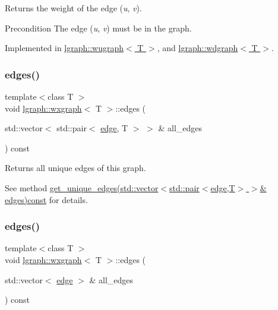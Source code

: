 Returns the weight of the edge ({\itshape u}, {\itshape v}). 

\begin{DoxyPrecond}{Precondition}
The edge ({\itshape u}, {\itshape v}) must be in the graph. 
\end{DoxyPrecond}


Implemented in \hyperlink{classlgraph_1_1wugraph_a38ed0dfad1c531dd3e6fc217cc061c2d}{lgraph\+::wugraph$<$ T $>$}, and \hyperlink{classlgraph_1_1wdgraph_a319aea927db9734903b4cf7d147ad687}{lgraph\+::wdgraph$<$ T $>$}.

\mbox{\label{classlgraph_1_1wxgraph_a1b89f56544185e33d54e72a8ed19a789}} 
\subsubsection{\texorpdfstring{edges()}{edges()}\hspace{0.1cm}{\footnotesize\ttfamily [1/2]}}
{\footnotesize\ttfamily template$<$class T $>$ \\
void \hyperlink{classlgraph_1_1wxgraph}{lgraph\+::wxgraph}$<$ T $>$\+::edges (\begin{DoxyParamCaption}\item[{std\+::vector$<$ std\+::pair$<$ \hyperlink{namespacelgraph_a76bd7d50719f03de7a85db259d80d572}{edge}, T $>$ $>$ \&}]{all\+\_\+edges }\end{DoxyParamCaption}) const}



Returns all unique edges of this graph. 

See method \hyperlink{classlgraph_1_1wxgraph_a50a9be174538c50c0f2a7ebeaa34ca4d}{get\+\_\+unique\+\_\+edges(std\+::vector$<$std\+::pair$<$edge,\+T$>$ $>$\& edges)const} for details. \mbox{\label{classlgraph_1_1wxgraph_ae99b335ca0cc70f619ae7c186d2dc7ac}} 
\subsubsection{\texorpdfstring{edges()}{edges()}\hspace{0.1cm}{\footnotesize\ttfamily [2/2]}}
{\footnotesize\ttfamily template$<$class T $>$ \\
void \hyperlink{classlgraph_1_1wxgraph}{lgraph\+::wxgraph}$<$ T $>$\+::edges (\begin{DoxyParamCaption}\item[{std\+::vector$<$ \hyperlink{namespacelgraph_a76bd7d50719f03de7a85db259d80d572}{edge} $>$ \&}]{all\+\_\+edges }\end{DoxyParamCaption}) const}



